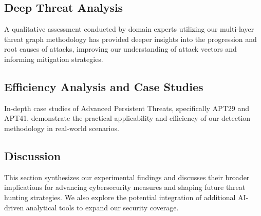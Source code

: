 \subsection{Deep Threat Analysis}\label{sec:deep-threat}
A qualitative assessment conducted by domain experts utilizing our multi-layer threat graph methodology has provided deeper insights into the progression and root causes of attacks, improving our understanding of attack vectors and informing mitigation strategies.

\subsection{Efficiency Analysis and Case Studies}\label{sec:effi}
In-depth case studies of Advanced Persistent Threats, specifically APT29 and APT41, demonstrate the practical applicability and efficiency of our detection methodology in real-world scenarios.

\subsection{Discussion}\label{sec:dis}
This section synthesizes our experimental findings and discusses their broader implications for advancing cybersecurity measures and shaping future threat hunting strategies. We also explore the potential integration of additional AI-driven analytical tools to expand our security coverage.
